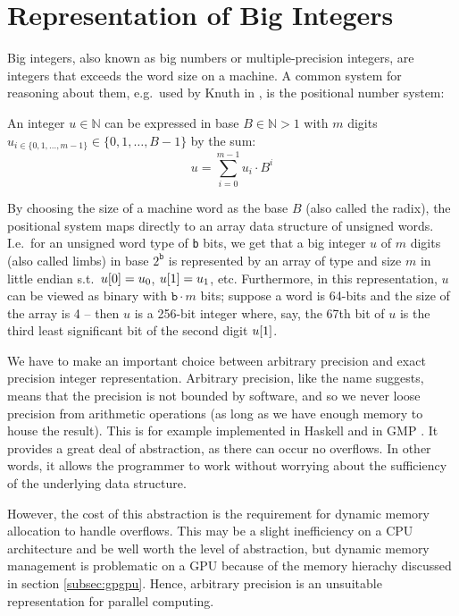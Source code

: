 \section{Representation of Big Integers}
\label{sec:big}
Big integers, also known as big numbers or multiple-precision integers, are
integers that exceeds the word size on a machine. A common system for reasoning
about them, e.g.\ used by Knuth in \cite{knuth97}, is the positional number
system:

\begin{definition}\label{def:bigints}
  An integer $u \in \mathbb{N}$ can be expressed in base $B \in \mathbb{N}>1$ with
  $m$ digits $u_{i\in \{0,1,\ldots,m-1\}}\in\{0,1,\ldots,B-1\}$ by the sum:
  \begin{equation}
\label{eq:rep}
u = \sum_{i=0}^{m-1}u_i\cdot B^{i}
\end{equation}
\end{definition}

By choosing the size of a machine word as the base $B$ (also called the radix),
the positional system maps directly to an array data structure of unsigned
words. I.e.\ for an unsigned word type \uint{} of \texttt{b} bits, we get that a
big integer $u$ of $m$ digits (also called limbs) in base $2^{\mathtt{b}}$ is
represented by an array of type \uint{} and size $m$ in little endian s.t.\
$u\mathtt{[}0\mathtt{]} = u_0$, $u\mathtt{[}1\mathtt{]} = u_1$, etc. Furthermore, in this
representation, $u$ can be viewed as binary with ${\mathtt{b}\cdot m}$ bits; suppose
a word is 64-bits and the size of the array is 4 -- then $u$ is a 256-bit integer
where, say, the 67th bit of $u$ is the third least significant bit of the second
digit $u\mathtt{[}1\mathtt{]}$.

We have to make an important choice between arbitrary precision and exact
precision integer representation. Arbitrary precision, like the name suggests,
means that the precision is not bounded by software, and so we never loose
precision from arithmetic operations (as long as we have enough memory to house
the result). This is for example implemented in Haskell and in GMP
\cite{marlow2010haskell,GMP}. It provides a great deal of abstraction, as there
can occur no overflows. In other words, it allows the programmer to work without
worrying about the sufficiency of the underlying data structure.

However, the cost of this abstraction is the requirement for dynamic memory
allocation to handle overflows. This may be a slight inefficiency on a CPU
architecture and be well worth the level of abstraction, but dynamic memory
management is problematic on a GPU because of the memory hierachy discussed in
section \ref{subsec:gpgpu}. Hence, arbitrary precision is an unsuitable
representation for parallel computing.

